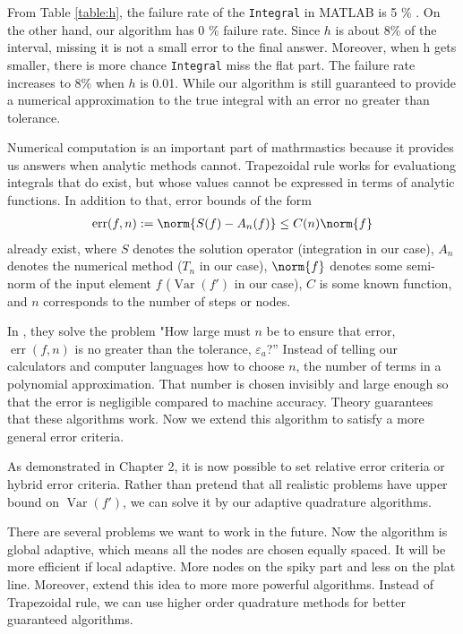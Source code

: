 \documentclass{iitthesis}
\DeclareMathOperator{\Var}{Var}
\DeclareMathOperator{\err}{err}
\begin{document}
From Table \ref{table:h}, the failure rate of the \texttt{Integral} in MATLAB is 5 \% . On the other hand, our algorithm has 0 \% failure rate. Since $h$ is about 8\% of the interval, missing it is not a small error to the final answer. Moreover, when h gets smaller, there is more chance \texttt{Integral} miss the flat part. The failure rate increases to 8\% when $h$ is 0.01. While our algorithm is still guaranteed to provide a numerical approximation to the true integral with an error no greater than tolerance.



Numerical computation is an important part of mathrmastics because it provides us answers when analytic methods cannot. Trapezoidal rule works for evaluationg integrals that do exist, but whose values cannot be expressed in terms of analytic functions. In addition to that, error bounds of the form 
\begin{align*}
\err(f,n):=\norm{S(f)-A_n(f)} \le C(n) \norm{f}
\end{align*}
already exist, where $S$ denotes the solution operator (integration in our case), $A_n$ denotes the numerical method ($T_n$ in our case),  $\norm{f}$ denotes some semi-norm of the input element $f$ ($\Var(f')$ in our case), $C$ is some known function, and $n$ corresponds to the number of steps or nodes. 

In \cite{Fred}, they solve the problem "How large must $n$ be to ensure that error, $\err(f,n)$  is no greater than the tolerance, $\varepsilon_a$?'' Instead of telling our calculators and computer languages how to choose $n$, the number of terms in a polynomial approximation.  That number is chosen invisibly and large enough so that the error is negligible compared to machine accuracy.  Theory guarantees that these algorithms work. Now we extend this algorithm to satisfy a more general error criteria.

As demonstrated in Chapter 2, it is now possible to set relative error criteria or hybrid error criteria. Rather than pretend that all realistic problems have upper bound on $\Var (f')$, we can solve it by our adaptive quadrature algorithms.

There are several problems we want to work in the future. Now the algorithm is global adaptive, which means all the nodes are chosen equally spaced. It will be more efficient if local adaptive. More nodes on the spiky part and less on the plat line. Moreover, extend this idea to more more powerful algorithms. Instead of Trapezoidal rule, we can use higher order quadrature methods for better guaranteed algorithms.
\end{document}
